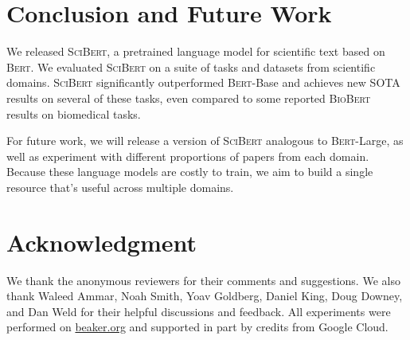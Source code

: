 \documentclass[11pt,a4paper]{article}
\newcommand{\bert}{\textsc{Bert}\xspace}
\newcommand{\scibert}{\textsc{SciBert}\xspace}
\newcommand{\biobert}{\textsc{BioBert}\xspace}
\begin{document}
\section{Conclusion and Future Work}
We released \scibert, a pretrained language model for scientific text based on \bert.
We evaluated \scibert on a suite of tasks and datasets from scientific domains. \scibert significantly outperformed \bert-Base and achieves new SOTA results on several of these tasks, even compared to some reported \biobert~\cite{Lee2019BioBERTAP} results on biomedical tasks.

For future work, we will release a version of \scibert analogous to \bert-Large, as well as experiment with different proportions of papers from each domain.  Because these language models are costly to train, we aim to build a single resource that's useful across multiple domains.  


\section*{Acknowledgment}
We thank the anonymous reviewers for their comments and suggestions.  We also thank Waleed Ammar, Noah Smith, Yoav Goldberg, Daniel King, Doug Downey, and Dan Weld for their helpful discussions and feedback.
All experiments were performed on \url{beaker.org} and supported in part by credits from Google Cloud.
 





\end{document}
